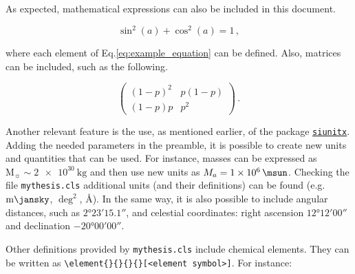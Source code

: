 As expected, mathematical expressions can also be included in this document.

\begin{equation}\label{eq:example_equation}
    \sin^2(a)+\cos^2(a) = 1\,,
\end{equation}

\noindent where each element of Eq.\ref{eq:example_equation} can be defined. Also, matrices can be included, such as the following.

\begin{equation}\label{eq:example_matrix}
    \begin{pmatrix}
      (1 - p)^{2} & p (1 - p)\\
      (1 - p) p   & p^{2}
    \end{pmatrix}\,.
\end{equation}

Another relevant feature is the use, as mentioned earlier, of the package \href{https://ctan.org/pkg/siunitx}{\texttt{siunitx}}. Adding the needed parameters in the preamble, it is possible to create new units and quantities that can be used. For instance, masses can be expressed as $\mathrm{M}_{\sun} \sim \qty{2e30}{\kg}$ and then use new units as $M_{a} = \qty{1e6}{\msun}$. Checking the file \texttt{mythesis.cls} additional units (and their definitions) can be found (e.g. $\unit{\milli\jansky}$, $\unit{\deg^{2}}$, $\unit{\angstrom}$). In the same way, it is also possible to include angular distances, such as $\ang[angle-symbol-over-decimal]{2;23;15.1}$, and celestial coordinates: right ascension $\ang[angle-symbol-degree=h, angle-symbol-minute=m, angle-symbol-second=s]{12;12;00}$ and declination $\ang{-20;00;00}$.

Other definitions provided by \texttt{mythesis.cls} include chemical elements. They can be written as \texttt{\textbackslash{}element\{<electrical charge>\}\{<number of nucleons>\}\{<number of protons>\}\{<number of neutrons>\}[<element symbol>]}. For instance:

\begin{description}[nosep]
    \item {}  %
    \item {}  %
    \item {}  %
    \item {}  %
    \item {}  %
\end{description}
